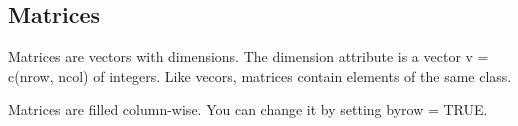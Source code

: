 \documentclass[]{article}
\newenvironment{Shaded}{\begin{snugshade}}{\end{snugshade}}
\newcommand{\KeywordTok}[1]{\textcolor[rgb]{0.13,0.29,0.53}{\textbf{#1}}}
\newcommand{\DataTypeTok}[1]{\textcolor[rgb]{0.13,0.29,0.53}{#1}}
\newcommand{\DecValTok}[1]{\textcolor[rgb]{0.00,0.00,0.81}{#1}}
\newcommand{\StringTok}[1]{\textcolor[rgb]{0.31,0.60,0.02}{#1}}
\newcommand{\OtherTok}[1]{\textcolor[rgb]{0.56,0.35,0.01}{#1}}
\newcommand{\OperatorTok}[1]{\textcolor[rgb]{0.81,0.36,0.00}{\textbf{#1}}}
\newcommand{\NormalTok}[1]{#1}
\begin{document}
\subsection{Matrices}\label{matrices}

Matrices are vectors with dimensions. The dimension attribute is a
vector v = c(nrow, ncol) of integers. Like vecors, matrices contain
elements of the same class.

\begin{Shaded}
\end{Shaded}

Matrices are filled column-wise. You can change it by setting byrow =
TRUE.
\end{document}
